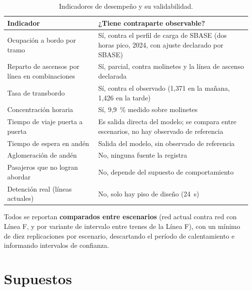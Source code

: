\documentclass{article}
\begin{document}
\begin{table}[H]
\centering
\small
\begin{tabular}{@{}L{5.5cm}L{8cm}@{}}
\toprule
Indicador & ¿Tiene contraparte observable? \\
\midrule
Ocupación a bordo por tramo & Sí, contra el perfil de carga de SBASE (dos horas
  pico, 2024, con ajuste declarado por SBASE) \\
Reparto de ascensos por línea en combinaciones & Sí, parcial, contra molinetes y la
  línea de ascenso declarada \\
Tasa de transbordo & Sí, contra el observado (1,371 en la mañana, 1,426 en la
  tarde) \\
Concentración horaria & Sí, 9,9~\% medido sobre molinetes \\
Tiempo de viaje puerta a puerta & Es salida directa del modelo; se compara entre
  escenarios, no hay observado de referencia \\
Tiempo de espera en andén & Salida del modelo, sin observado de referencia \\
Aglomeración de andén & No, ninguna fuente la registra \\
Pasajeros que no logran abordar & No, depende del supuesto de comportamiento \\
Detención real (líneas actuales) & No, solo hay piso de diseño (24~s) \\
\bottomrule
\end{tabular}
\caption{Indicadores de desempeño y su validabilidad.}
\end{table}

Todos se reportan \textbf{comparados entre escenarios} (red actual contra red con
Línea F, y por variante de intervalo entre trenes de la Línea F), con un mínimo de
diez replicaciones por escenario, descartando el período de calentamiento e
informando intervalos de confianza.

\section{Supuestos}
\label{sec:supuestos}
\end{document}
